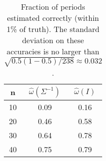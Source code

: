 \begin{table}[ht]
\centering
\begin{tabular}{c|cc}
n & $\widehat{\omega}(\Sigma^{-1})$ &  $\widehat{\omega}(I)$ \\
  \hline10&0.09&0.16\\20&0.46&0.58\\30&0.64&0.78\\40&0.75&0.79\\\hline
\end{tabular}
\caption{Fraction of periods estimated correctly (within 1\% of truth). The standard deviation on these accuracies is no larger than $\sqrt{0.5(1-0.5)/238} \approx 0.032$ .}
\label{tab:period_est_results}
\end{table}
